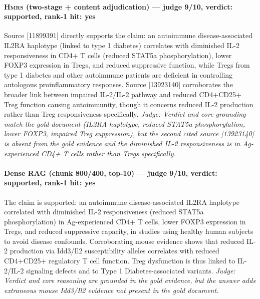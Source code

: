\documentclass[sigconf, review, anonymous]{acmart}
\begin{document}
\paragraph{\textbf{\textsc{Hmrs}} (two-stage + content adjudication) --- judge 9/10, verdict: supported, rank-1 hit: yes}
\noindent Source [11899391] directly supports the claim: an autoimmune disease-associated IL2RA haplotype (linked to type 1 diabetes) correlates with diminished IL-2 responsiveness in CD4+ T cells (reduced STAT5a phosphorylation), lower FOXP3 expression in Tregs, and reduced suppressive function, while Tregs from type 1 diabetes and other autoimmune patients are deficient in controlling autologous proinflammatory responses. Source [13923140] corroborates the broader link between impaired IL-2/IL-2 pathway and reduced CD4+CD25+ Treg function causing autoimmunity, though it concerns reduced IL-2 production rather than Treg responsiveness specifically.
\noindent\small\textit{Judge: Verdict and core grounding match the gold document (IL2RA haplotype, reduced STAT5a phosphorylation, lower FOXP3, impaired Treg suppression), but the second cited source [13923140] is absent from the gold evidence and the diminished IL-2 responsiveness is in Ag-experienced CD4+ T cells rather than Tregs specifically.}
\paragraph{Dense RAG (chunk 800/400, top-10) --- judge 9/10, verdict: supported, rank-1 hit: yes}
\noindent The claim is supported: an autoimmune disease-associated IL2RA haplotype correlated with diminished IL-2 responsiveness (reduced STAT5a phosphorylation) in Ag-experienced CD4+ T cells, lower FOXP3 expression in Tregs, and reduced suppressive capacity, in studies using healthy human subjects to avoid disease confounds. Corroborating mouse evidence shows that reduced IL-2 production via Idd3/Il2 susceptibility alleles correlates with reduced CD4+CD25+ regulatory T cell function. Treg dysfunction is thus linked to IL-2/IL-2 signaling defects and to Type 1 Diabetes-associated variants.
\noindent\small\textit{Judge: Verdict and core reasoning are grounded in the gold evidence, but the answer adds extraneous mouse Idd3/Il2 evidence not present in the gold document.}
\end{document}
